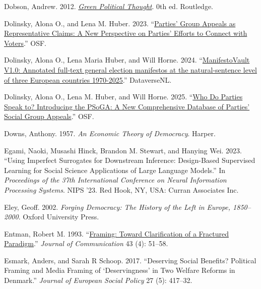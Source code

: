 \documentclass[12pt]{article}
\begin{document}
\begin{CSLReferences}{1}{0}
Dobson, Andrew. 2012. \emph{\href{https://doi.org/10.4324/9780203131671}{Green Political Thought}}. 0th ed. Routledge.

Dolinsky, Alona O., and Lena M. Huber. 2023. {``\href{https://doi.org/10.31219/osf.io/a9sf6_v1}{Parties' Group Appeals as Representative Claims: A New Perspective on Parties' Efforts to Connect with Voters}.''} {OSF}.

Dolinsky, Alona O., Lena Maria Huber, and Will Horne. 2024. {``\href{https://doi.org/10.34894/VKQSPO}{{ManifestoVault V1.0: Annotated full-text general election manifestos at the natural-sentence level of three European countries 1970-2025}}.''} DataverseNL.

Dolinsky, Alona O., Lena M. Huber, and Will Horne. 2025. {``\href{https://doi.org/10.31219/osf.io/64jwa_v1}{Who Do Parties Speak to? Introducing the {PSoGA}: A New Comprehensive Database of Parties' Social Group Appeals}.''} {OSF}.

Downs, Anthony. 1957. \emph{An Economic Theory of Democracy}. Harper.

Egami, Naoki, Musashi Hinck, Brandon M. Stewart, and Hanying Wei. 2023. {``Using Imperfect Surrogates for Downstream Inference: Design-Based Supervised Learning for Social Science Applications of Large Language Models.''} In \emph{Proceedings of the 37th International Conference on Neural Information Processing Systems}. NIPS '23. Red Hook, NY, USA: Curran Associates Inc.

Eley, Geoff. 2002. \emph{Forging Democracy: The History of the Left in Europe, 1850--2000}. Oxford University Press.

Entman, Robert M. 1993. {``\href{https://doi.org/10.1111/j.1460-2466.1993.tb01304.x}{Framing: Toward Clarification of a Fractured Paradigm}.''} \emph{Journal of Communication} 43 (4): 51--58.

Esmark, Anders, and Sarah R Schoop. 2017. {``Deserving Social Benefits? Political Framing and Media Framing of {`Deservingness'} in Two Welfare Reforms in Denmark.''} \emph{Journal of European Social Policy} 27 (5): 417--32.


\end{CSLReferences}
\end{document}
